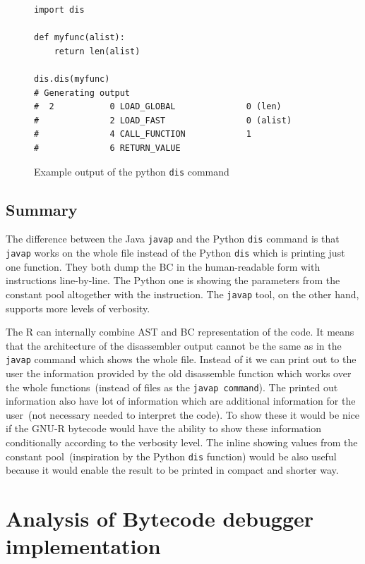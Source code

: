 \documentclass[thesis=M,english]{FITthesis}[2018/10/20]
\newcommand{\code}[1]{\texttt{#1}}
\begin{document}
\begin{figure}[H]
\begin{lstlisting}
import dis

def myfunc(alist):
    return len(alist)

dis.dis(myfunc)
# Generating output
#  2           0 LOAD_GLOBAL              0 (len)
#              2 LOAD_FAST                0 (alist)
#              4 CALL_FUNCTION            1
#              6 RETURN_VALUE

\end{lstlisting}
	\caption{Example output of the python \code{dis} command}\label{fig:python-dis-output-example}
\end{figure}

\subsection{Summary}

The difference between the Java \code{javap} and the Python \code{dis} command is that \code{javap} works on the whole file instead of the Python \code{dis} which is printing just one function. They both dump the BC in the human-readable form with instructions line-by-line. The Python one is showing the parameters from the constant pool altogether with the instruction. The \code{javap} tool, on the other hand, supports more levels of verbosity.

The R can internally combine AST and BC representation of the code. It means that the architecture of the disassembler output cannot be the same as in the \code{javap} command which shows the whole file. Instead of it we can print out to the user the information provided by the old disassemble function which works over the whole functions~(instead of files as the \code{javap command}). The printed out information also have lot of information which are additional information for the user~(not necessary needed to interpret the code). To show these it would be nice if the GNU-R bytecode would have the ability to show these information conditionally according to the verbosity level. The inline showing values from the constant pool~(inspiration by the Python \code{dis} function) would be also useful because it would enable the result to be printed in compact and shorter way.

\section{Analysis of Bytecode debugger implementation}\label{analysis-of-debugger}
\end{document}
